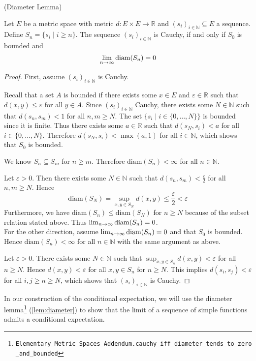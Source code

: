 \begin{lemma}\label{lem:diameter} (Diameter Lemma)\par
	Let $E$ be a metric space with metric $d : E \times E \rightarrow \mathbb{R}$ and $(s_i)_{i\in\mathbb{N}} \subseteq E$ a sequence. Define $S_n = \{s_i \; \vert \; i \ge n \}$. The sequence $(s_i)_{i\in\mathbb{N}}$ is Cauchy, if and only if $S_0$ is bounded and
	\[
		\lim_{n \to \infty} \textup{diam}(S_n) = 0
	\]
\end{lemma}
\begin{proof}
First, assume $(s_i)_{i\in\mathbb{N}}$ is Cauchy. 

Recall that a set $A$ is bounded if there exists some $x \in E$ and $\varepsilon \in \mathbb{R}$ such that $d(x,y) \le \varepsilon$ for all $y \in A$. Since $(s_i)_{i\in\mathbb{N}}$ Cauchy, there exists some $N \in \mathbb{N}$ such that $d(s_n,s_m) < 1$ for all $n, m \ge N$. The set $\{s_i \; \vert \; i \in \{0,\dots,N\}\}$ is bounded since it is finite. Thus there exists some $a \in \mathbb{R}$ such that $d(s_N, s_i) < a$ for all $i \in \{0,\dots,N\}$. Therefore $d(s_N, s_i) < \max(a,1)$ for all $i \in \mathbb{N}$, which shows that $S_0$ is bounded. 

We know $S_n \subseteq S_m$ for $n \ge m$. Therefore $\textrm{diam}(S_n) < \infty$ for all $n \in \mathbb{N}$.

Let $\varepsilon > 0$. Then there exists some $N \in \mathbb{N}$ such that $d(s_n,s_m) < \frac{\varepsilon}{2}$ for all $n, m \ge N$. Hence
\[
	\textrm{diam}(S_N) = \sup_{x,y \in S_N} d(x,y) \le \frac{\varepsilon}{2} < \varepsilon
\]
Furthermore, we have $\textrm{diam}(S_n) \le \textrm{diam}(S_N)$ for $n \ge N$ because of the subset relation stated above. Thus $\lim_{n \to \infty} \textup{diam}(S_n) = 0$.\\

For the other direction, assume $\lim_{n \to \infty} \textup{diam}(S_n) = 0$ and that $S_0$ is bounded. Hence $\textrm{diam}(S_n) < \infty$ for all $n \in \mathbb{N}$ with the same argument as above. 

Let $\varepsilon > 0$. There exists some $N \in \mathbb{N}$ such that $\sup_{x,y \in S_n} d(x,y) < \varepsilon$ for all $n \ge N$. Hence $d(x,y) < \varepsilon$ for all $x, y \in S_n$ for $n \ge N$. This implies $d(s_i,s_j) < \varepsilon$ for all $i, j \ge n \ge N$, which shows that $(s_i)_{i\in\mathbb{N}}$ is Cauchy.
\end{proof}

In our construction of the conditional expectation, we will use the diameter lemma\footnote{\texttt{Elementary\_Metric\_Spaces\_Addendum.cauchy\_iff\_diameter\_tends\_to\_zero\_and\_bounded}} (\ref{lem:diameter}) to show that the limit of a sequence of simple functions admits a conditional expectation. 


